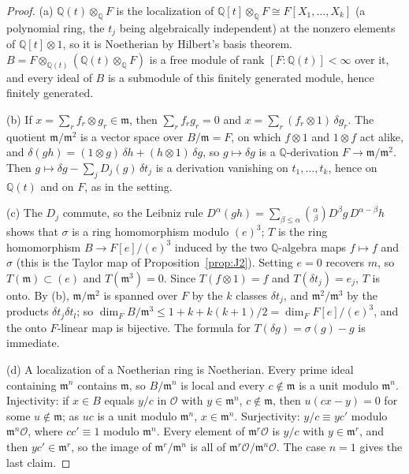 \documentclass[11pt]{amsart}
\newcommand{\Q}{\mathbb{Q}}
\theoremstyle{plain}
\theoremstyle{definition}
\begin{document}
\begin{proof}
(a) $\Q(t)\otimes_\Q F$ is the localization of $\Q[t]\otimes_\Q F\cong F[X_1,\dots,X_k]$ (a polynomial ring, the $t_j$ being algebraically independent) at the nonzero elements
of $\Q[t]\otimes1$, so it is Noetherian by Hilbert's basis theorem. $B=F\otimes_{\Q(t)}(\Q(t)\otimes_\Q F)$
is a free module of rank $[F:\Q(t)]<\infty$ over it, and every ideal of $B$ is a submodule of this finitely
generated module, hence finitely generated.

(b) If $x=\sum_rf_r\otimes g_r\in\mathfrak m$, then $\sum_rf_rg_r=0$ and
$x=\sum_r(f_r\otimes1)\,\delta g_r$. The quotient $\mathfrak m/\mathfrak m^2$ is a vector space over
$B/\mathfrak m=F$, on which $f\otimes1$ and $1\otimes f$ act alike, and
$\delta(gh)=(1\otimes g)\,\delta h+(h\otimes1)\,\delta g$, so $g\mapsto\delta g$ is a $\Q$-derivation
$F\to\mathfrak m/\mathfrak m^2$. Then $g\mapsto\delta g-\sum_jD_j(g)\,\delta t_j$ is a derivation vanishing
on $t_1,\dots,t_k$, hence on $\Q(t)$ and on $F$, as in the setting.

(c) The $D_j$ commute, so the Leibniz rule
$D^\alpha(gh)=\sum_{\beta\le\alpha}\binom\alpha\beta D^\beta g\,D^{\alpha-\beta}h$ shows that $\sigma$ is a ring
homomorphism modulo $(e)^3$; $T$ is the ring homomorphism $B\to F[e]/(e)^3$ induced by the two
$\Q$-algebra maps $f\mapsto f$ and $\sigma$ (this is the Taylor map of Proposition~\ref{prop:J2}). Setting $e=0$
recovers $m$, so $T(\mathfrak m)\subset(e)$ and $T(\mathfrak m^3)=0$. Since $T(f\otimes1)=f$ and
$T(\delta t_j)=e_j$, $T$ is onto. By (b), $\mathfrak m/\mathfrak m^2$ is spanned over $F$ by the $k$
classes $\delta t_j$, and $\mathfrak m^2/\mathfrak m^3$ by the products $\delta t_j\delta t_l$; so
$\dim_FB/\mathfrak m^3\le1+k+k(k+1)/2=\dim_FF[e]/(e)^3$, and the onto $F$-linear map is bijective. The
formula for $T(\delta g)=\sigma(g)-g$ is immediate.

(d) A localization of a Noetherian ring is Noetherian. Every prime ideal containing $\mathfrak m^n$
contains $\mathfrak m$, so $B/\mathfrak m^n$ is local and every $c\notin\mathfrak m$ is a unit modulo
$\mathfrak m^n$. Injectivity: if $x\in B$ equals $y/c$ in $\mathcal O$ with $y\in\mathfrak m^n$,
$c\notin\mathfrak m$, then $u(cx-y)=0$ for some $u\notin\mathfrak m$; as $uc$ is a unit modulo
$\mathfrak m^n$, $x\in\mathfrak m^n$. Surjectivity: $y/c\equiv yc'$ modulo $\mathfrak m^n\mathcal O$, where
$cc'\equiv1$ modulo $\mathfrak m^n$. Every element of $\mathfrak m^r\mathcal O$ is $y/c$ with $y\in\mathfrak m^r$,
and then $yc'\in\mathfrak m^r$, so the image of $\mathfrak m^r/\mathfrak m^n$ is all of
$\mathfrak m^r\mathcal O/\mathfrak m^n\mathcal O$. The case $n=1$ gives the last claim.


\end{proof}
\end{document}
